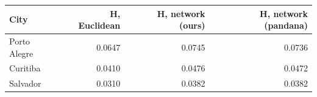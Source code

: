 \begin{tabular}{lrrr}
\toprule
City & H, Euclidean & H, network (ours) & H, network (pandana) \\
\midrule
Porto Alegre & 0.0647 & 0.0745 & 0.0736 \\
Curitiba & 0.0410 & 0.0476 & 0.0472 \\
Salvador & 0.0310 & 0.0382 & 0.0382 \\
\bottomrule
\end{tabular}
